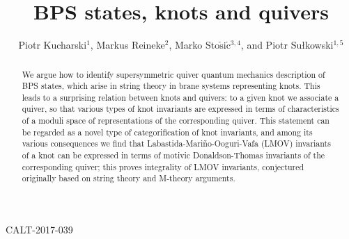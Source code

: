 \documentclass[
 reprint,
 amsmath,amssymb,
 aps,prl
]{revtex4-1}
\begin{document}
\begin{flushright}
CALT-2017-039
\end{flushright}
\title{BPS states, knots and quivers}

\author{Piotr Kucharski$^{1}$, Markus Reineke$^{2}$, Marko Sto$\check{\text{s}}$i$\acute{\text{c}}$$^{3,4}$, and Piotr Su{\l}kowski$^{1,5}$\\
}




\begin{abstract}

We argue how to identify supersymmetric quiver quantum mechanics description of BPS states, which arise in string theory in brane systems representing knots. This leads to a surprising relation between knots and quivers: to a given knot we associate a quiver, so that various types of knot invariants are expressed in terms of characteristics of a moduli space of representations of the corresponding quiver. This statement can be regarded as a novel type of categorification of knot invariants, and among its various consequences we find that Labastida-Mari{\~n}o-Ooguri-Vafa (LMOV) invariants of a knot can be expressed in terms of motivic Donaldson-Thomas invariants of the corresponding quiver; this proves integrality of LMOV invariants, conjectured originally based on string theory and M-theory arguments.



\end{abstract}
\end{document}
